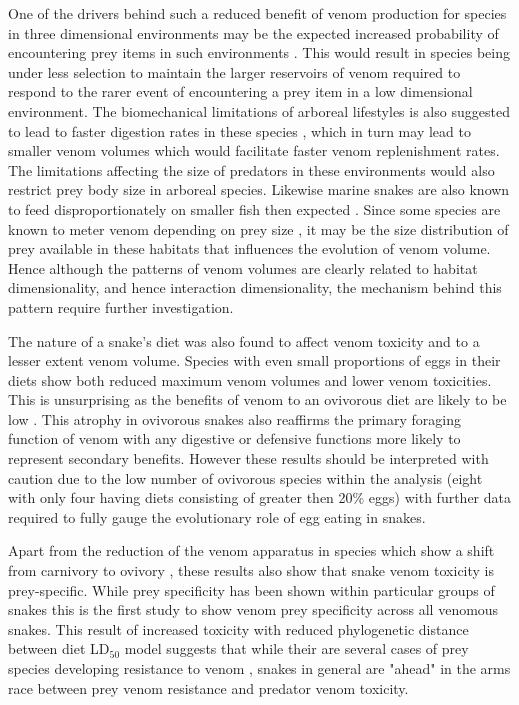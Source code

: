 One of the drivers behind such a reduced benefit of venom production for species in three dimensional environments may be the expected increased probability of encountering prey items in such environments \citep{pawar2012dimensionality}. This would result in species being under less selection to maintain the larger reservoirs of venom required to respond to the rarer event of encountering a prey item in a low dimensional environment. The biomechanical limitations of arboreal lifestyles is also suggested to lead to faster digestion rates in these species \citep{lillywhite2002patterns}, which in turn may lead to smaller venom volumes which would facilitate faster venom replenishment rates. The limitations affecting the size of predators in these environments would also restrict prey body size in arboreal species. Likewise marine snakes are also known to feed disproportionately on smaller fish then expected \citep{voris1981size}. Since some species are known to meter venom depending on prey size \citep{hayes1995venom}, it may be the size distribution of prey available in these habitats that influences the evolution of venom volume. Hence although the patterns of venom volumes are clearly related to habitat dimensionality, and hence interaction dimensionality, the mechanism behind this pattern require further investigation. %


The nature of a snake's diet was also found to affect venom toxicity and to a lesser extent venom volume. Species with even small proportions of eggs in their diets show both reduced maximum venom volumes and lower venom toxicities. This is unsurprising as the benefits of venom to an ovivorous diet are likely to be low \citep{li2005eggs}. This atrophy in ovivorous snakes also reaffirms the primary foraging function of venom with any digestive \citep{rodriguez1992venom} or defensive functions \citep{jansa2011adaptive} more likely to represent secondary benefits. However these results should be interpreted with caution due to the low number of ovivorous species within the analysis (eight with only four having diets consisting of greater then 20\% eggs) with further data required to fully gauge the evolutionary role of egg eating in snakes. 


Apart from the reduction of the venom apparatus in species which show a shift from carnivory to ovivory \citep{li2005eggs}, these results also show that snake venom toxicity is prey-specific. While prey specificity has been shown within particular groups of snakes \citep{barlow2009coevolution,richards2012venom,daltry1996diet} this is the first study to show venom prey specificity across all venomous snakes. This result of increased toxicity with reduced phylogenetic distance between diet LD$_{50}$ model suggests that while their are several cases of prey species developing resistance to venom \citep{lillywhite2002patterns}, snakes in general are "ahead" in the arms race between prey venom resistance and predator venom toxicity.


